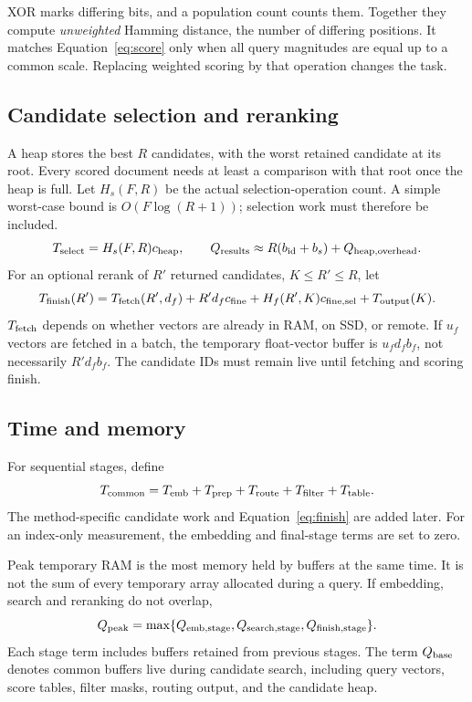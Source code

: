XOR marks differing bits, and a population count counts them. Together they compute
\emph{unweighted} Hamming distance, the number of differing positions. It
matches Equation~\eqref{eq:score} only when all query magnitudes are equal up to a common
scale. Replacing weighted scoring by that operation changes the task.

\subsection{Candidate selection and reranking}
A heap stores the best $R$ candidates, with the worst retained candidate at its root. Every scored document needs
at least a comparison with that root once the heap is full. Let $H_s(F,R)$ be the actual
selection-operation count. A simple worst-case bound is $O(F\log(R+1))$; selection work must therefore be included.
\begin{equation}
T_{\rm select}=H_s(F,R)c_{\rm heap},\qquad
Q_{\rm results}\approx R(b_{\rm id}+b_s)+Q_{\rm heap,overhead}.
\label{eq:selection}
\end{equation}
For an optional rerank of $R'$ returned candidates, $K\leq R'\leq R$, let
\begin{equation}
T_{\mathrm{finish}}(R')=T_{\rm fetch}(R',d_f)+R'd_f c_{\rm fine}
              +H_f(R',K)c_{\rm fine,sel}+T_{\rm output}(K).
\label{eq:finish}
\end{equation}
$T_{\rm fetch}$ depends on whether vectors are already in RAM, on SSD, or remote. If $u_f$
vectors are fetched in a batch, the temporary float-vector buffer is $u_f d_f b_f$, not
necessarily $R'd_f b_f$. The candidate IDs must remain live until fetching and scoring finish.

\subsection{Time and memory}
For sequential stages, define
\begin{equation}
T_{\mathrm{common}}=T_{\rm emb}+T_{\rm prep}+T_{\rm route}+T_{\rm filter}+T_{\rm table}.
\label{eq:common-time}
\end{equation}
The method-specific candidate work and Equation~\eqref{eq:finish} are added later. For an
index-only measurement, the embedding and final-stage terms are set to zero.

Peak temporary RAM is the most memory held by buffers at the same time. It is not the sum
of every temporary array allocated during a query. If embedding, search and reranking do not overlap,
\begin{equation}
Q_{\rm peak}=\max\{Q_{\rm emb,stage},Q_{\rm search,stage},Q_{\rm finish,stage}\}.
\label{eq:peak}
\end{equation}
Each stage term includes buffers retained from previous stages. The term $Q_{\mathrm{base}}$ denotes common
buffers live during candidate search, including query vectors, score tables, filter masks,
routing output, and the candidate heap.

